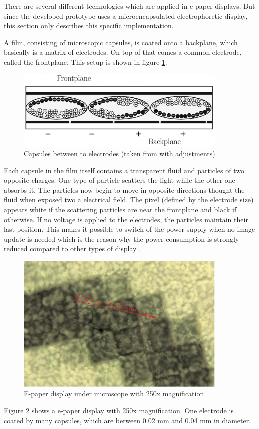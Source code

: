 There are several different technologies which are applied in e-paper displays.
But since the developed prototype uses a microencapsulated electrophoretic display, this section only describes this specific implementation.

A film, consisting of microscopic capsules, is coated onto a backplane, which basically is a matrix of electrodes.
On top of that comes a common electrode, called the frontplane.
This setup is shown in figure \ref{theory:capsules}.

\begin{figure}[H]
	\centering
	\includegraphics[width=0.9\textwidth]{2-theory/e-paper-display/graphics/capsules.pdf}
	\caption{Capsules between to electrodes (taken from \cite{amundson} with adjustments)\label{theory:capsules}}
\end{figure}

Each capsule in the film itself contains a transparent fluid and particles of two opposite charges.
One type of particle scatters the light while the other one absorbs it.
The particles now begin to move in opposite directions thought the fluid when exposed two a electrical field. 
The pixel (defined by the electrode size) appears white if the scattering particles are near the frontplane and black if otherwise.
If no voltage is applied to the electrodes, the particles maintain their last position.
This makes it possible to switch of the power supply when no image update is needed which is the reason why the power consumption is strongly reduced compared to other types of display \cite{amundson}.

\begin{figure}[H]
	\centering
	\includegraphics[width=0.9\textwidth]{2-theory/e-paper-display/graphics/epaper_mikroskop.pdf}
	\caption{E-paper display under microscope with 250x magnification\label{theory:micro}}
\end{figure}

Figure \ref{theory:micro} shows a e-paper display with 250x magnification.
One electrode is coated by many capsules, which are between 0.02 mm and 0.04 mm in diameter.